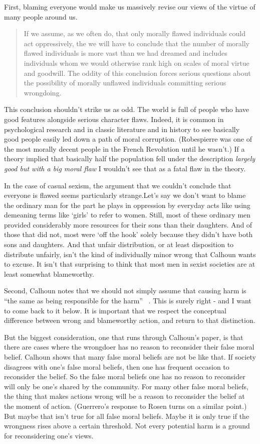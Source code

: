 First, blaming everyone would make us massively revise our views of the virtue of many people around us.

\begin{quote}
If we assume, as we often do, that only morally flawed individuals could act oppressively, the we will have to conclude that the number of morally flawed individuals is more vast than we had dreamed and includes individuals whom we would otherwise rank high on scales of moral virtue and goodwill. The oddity of this conclusion forces serious questions about the possibility of morally unflawed individuals committing serious wrongdoing. ~\citep[389]{Calhoun1989}
\end{quote}
This conclusion shouldn't strike us as odd. The world is full of people who have good features alongside serious character flaws. Indeed, it is common in psychological research and in classic literature and in history to see basically good people easily led down a path of moral corruption. (Robespierre was one of the most morally decent people in the French Revolution until he wasn't.) If a theory implied that basically half the population fell under the description \emph{largely good but with a big moral flaw} I wouldn't see that as a fatal flaw in the theory.

In the case of casual sexism, the argument that we couldn't conclude that everyone is flawed seems particularly strange.Let's say we don't want to blame the ordinary man for the part he plays in oppression by everyday acts like using demeaning terms like `girls' to refer to women. Still, most of these ordinary men provided considerably more resources for their sons than their daughters. And of those that did not, most were `off the hook' solely because they didn't have both sons and daughters. And that unfair distribution, or at least disposition to distribute unfairly, isn't the kind of individually minor wrong that Calhoun wants to excuse. It isn't that surprising to think that most men in sexist societies are at least somewhat blameworthy.

Second, Calhoun notes that we should not simply assume that causing harm is ``the same as being responsible for the harm'' ~\citep[392]{Calhoun1989}. This is surely right - and I want to come back to it below. It is important that we respect the conceptual difference between wrong and blameworthy action, and return to that distinction.

But the biggest consideration, one that runs through Calhoun's paper, is that there are cases where the wrongdoer has no reason to reconsider their false moral belief. Calhoun shows that many false moral beliefs are not be like that. If society disagrees with one's false moral beliefs, then one has frequent occasion to reconsider the belief. So the false moral beliefs one has no reason to reconsider will only be one's shared by the community. For many other false moral beliefs, the thing that makes actions wrong will be a reason to reconsider the belief at the moment of action. (Guerrero's response to Rosen turns on a similar point.) But maybe that isn't true for all false moral beliefs. Maybe it is only true if the wrongness rises above a certain threshold. Not every potential harm is a ground for reconsidering one's views.

